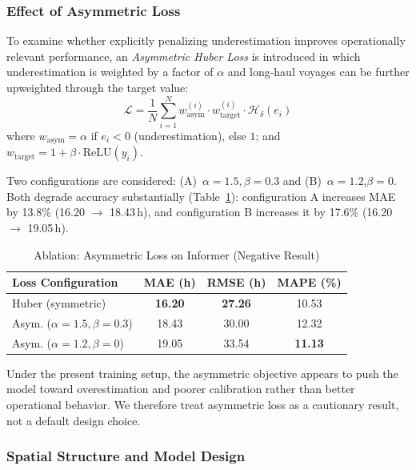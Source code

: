\documentclass[sigconf,anonymous]{acmart}%
\begin{document}
\subsubsection{Effect of Asymmetric Loss}

To examine whether explicitly penalizing underestimation improves operationally relevant performance, an \textit{Asymmetric Huber Loss} is introduced in which underestimation is weighted by a factor of $\alpha$ and long-haul voyages can be further upweighted through the target value:
\begin{equation}
    \mathcal{L} = \frac{1}{N} \sum_{i=1}^{N} w_{\text{asym}}^{(i)} \cdot w_{\text{target}}^{(i)} \cdot \mathcal{H}_\delta(e_i)
    \label{eq:loss}
\end{equation}
where $w_{\text{asym}} = \alpha$ if $e_i < 0$ (underestimation), else $1$; and $w_{\text{target}} = 1 + \beta \cdot \text{ReLU}(y_i)$.

Two configurations are considered: (A)~$\alpha{=}1.5, \beta{=}0.3$ and (B)~$\alpha{=}1.2$,\allowbreak $\beta{=}0$. Both degrade accuracy substantially (Table~\ref{tab:ablation_loss}): configuration A increases MAE by 13.8\% (16.20 $\to$ 18.43\,h), and configuration B increases it by 17.6\% (16.20 $\to$ 19.05\,h).

\begin{table}[t]
    \centering
    \caption{Ablation: Asymmetric Loss on Informer (Negative Result)}
    \label{tab:ablation_loss}
    \begin{tabular}{lccc}
        \toprule
        \textbf{Loss Configuration} & \textbf{MAE (h)} & \textbf{RMSE (h)} & \textbf{MAPE (\%)} \\
        \midrule
        Huber (symmetric) & \textbf{16.20} & \textbf{27.26} & 10.53 \\
        Asym. ($\alpha{=}1.5, \beta{=}0.3$) & 18.43 & 30.00 & 12.32 \\
        Asym. ($\alpha{=}1.2, \beta{=}0$) & 19.05 & 33.54 & \textbf{11.13} \\
        \bottomrule
    \end{tabular}
\end{table}

Under the present training setup, the asymmetric objective appears to push the model toward overestimation and poorer calibration rather than better operational behavior. We therefore treat asymmetric loss as a cautionary result, not a default design choice.

\subsubsection{Spatial Structure and Model Design}
\end{document}
